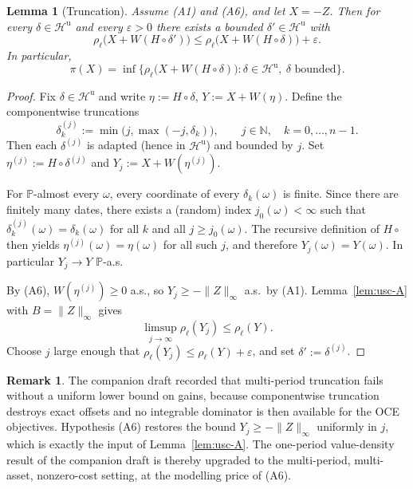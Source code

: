 \documentclass[11pt,a4paper]{report}
\numberwithin{equation}{chapter}
\theoremstyle{plain}
\newtheorem{lemma}[proposition]{Lemma}
\theoremstyle{definition}
\newtheorem{remark}[proposition]{Remark}
\newcommand{\PP}{\mathbb{P}}
\newcommand{\N}{\mathbb{N}}
\newcommand{\Hu}{\mathcal{H}^{\mathrm{u}}}
\begin{document}
\begin{lemma}[Truncation]\label{lem:truncation-A}
    Assume \textup{(A1)} and \textup{(A6)}, and let $X=-Z$. Then for every $\delta\in\Hu$ and every $\varepsilon>0$ there exists a bounded $\delta'\in\Hu$ with
    \[
        \rho_\ell\bigl(X+W(H\circ\delta')\bigr)\le\rho_\ell\bigl(X+W(H\circ\delta)\bigr)+\varepsilon.
    \]
    In particular,
    \[
        \pi(X)=\inf\bigl\{\rho_\ell\bigl(X+W(H\circ\delta)\bigr):\delta\in\Hu,\ \delta\text{ bounded}\bigr\}.
    \]
\end{lemma}

\begin{proof}
    Fix $\delta\in\Hu$ and write $\eta:=H\circ\delta$, $Y:=X+W(\eta)$. Define the componentwise truncations
    \[
        \delta^{(j)}_k:=\min\bigl(j,\max(-j,\delta_k)\bigr),\qquad j\in\N,\quad k=0,\dots,n-1.
    \]
    Then each $\delta^{(j)}$ is adapted (hence in $\Hu$) and bounded by $j$. Set $\eta^{(j)}:=H\circ\delta^{(j)}$ and $Y_j:=X+W(\eta^{(j)})$.

    For $\PP$-almost every $\omega$, every coordinate of every $\delta_k(\omega)$ is finite. Since there are finitely many dates, there exists a (random) index $j_0(\omega)<\infty$ such that $\delta^{(j)}_k(\omega)=\delta_k(\omega)$ for all $k$ and all $j\ge j_0(\omega)$. The recursive definition of $H\circ{}$ then yields $\eta^{(j)}(\omega)=\eta(\omega)$ for all such $j$, and therefore $Y_j(\omega)=Y(\omega)$. In particular $Y_j\to Y$ $\PP$-a.s.

    By (A6), $W(\eta^{(j)})\ge0$ a.s., so $Y_j\ge-\|Z\|_\infty$ a.s.\ by (A1). Lemma~\ref{lem:usc-A} with $B=\|Z\|_\infty$ gives
    \[
        \limsup_{j\to\infty}\rho_\ell(Y_j)\le\rho_\ell(Y).
    \]
    Choose $j$ large enough that $\rho_\ell(Y_j)\le\rho_\ell(Y)+\varepsilon$, and set $\delta':=\delta^{(j)}$.
\end{proof}

\begin{remark}\label{rem:truncation-vs-companion}
    The companion draft recorded that multi-period truncation fails without a uniform lower bound on gains, because componentwise truncation destroys exact offsets and no integrable dominator is then available for the OCE objectives. Hypothesis (A6) restores the bound $Y_j\ge-\|Z\|_\infty$ uniformly in $j$, which is exactly the input of Lemma~\ref{lem:usc-A}. The one-period value-density result of the companion draft is thereby upgraded to the multi-period, multi-asset, nonzero-cost setting, at the modelling price of (A6).
\end{remark}
\end{document}
